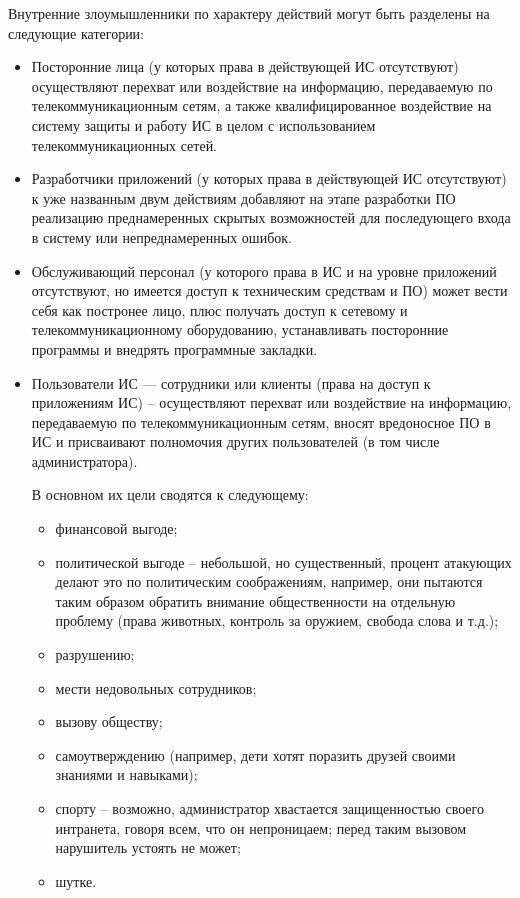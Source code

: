 Внутренние злоумышленники по характеру действий могут быть разделены на
следующие категории:
\begin{itemize}
  \item Посторонние лица (у которых права в действующей ИС отсутствуют) осуществляют
перехват или воздействие на информацию, передаваемую по телекоммуникационным
сетям, а также квалифицированное воздействие на систему защиты и работу ИС в
целом с использованием телекоммуникационных сетей.
  \item Разработчики приложений (у которых права в действующей ИС отсутствуют) к уже
названным двум действиям добавляют на этапе разработки ПО реализацию
преднамеренных скрытых возможностей для последующего входа в систему или
непреднамеренных ошибок.
  \item Обслуживающий персонал (у которого права в ИС и на уровне приложений
отсутствуют, но имеется доступ к техническим средствам и ПО) может вести себя
как постронее лицо, плюс получать доступ к сетевому и телекоммуникационному
оборудованию, устанавливать посторонние программы и внедрять программные
закладки.
  \item Пользователи ИС --- сотрудники или клиенты (права на доступ к приложениям ИС)
-- осуществляют перехват или воздействие на информацию, передаваемую по
телекоммуникационным сетям, вносят вредоносное ПО в ИС и присваивают полномочия
других пользователей (в том числе администратора).

В основном их цели сводятся к следующему:
\begin{itemize}
  \item финансовой выгоде;
  \item политической выгоде -- небольшой, но существенный, процент атакующих
  делают это по политическим соображениям, например, они пытаются таким образом
  обратить внимание общественности на отдельную проблему (права животных,
  контроль за оружием, свобода слова и т.д.);
  \item разрушению;
  \item мести недовольных сотрудников;
  \item вызову обществу;
  \item самоутверждению (например, дети хотят поразить друзей своими знаниями и
  навыками);
  \item спорту -- возможно, администратор хвастается защищенностью своего
  интранета, говоря всем, что он непроницаем; перед таким вызовом нарушитель устоять не может;
  \item шутке.
\end{itemize}
\end{itemize}

